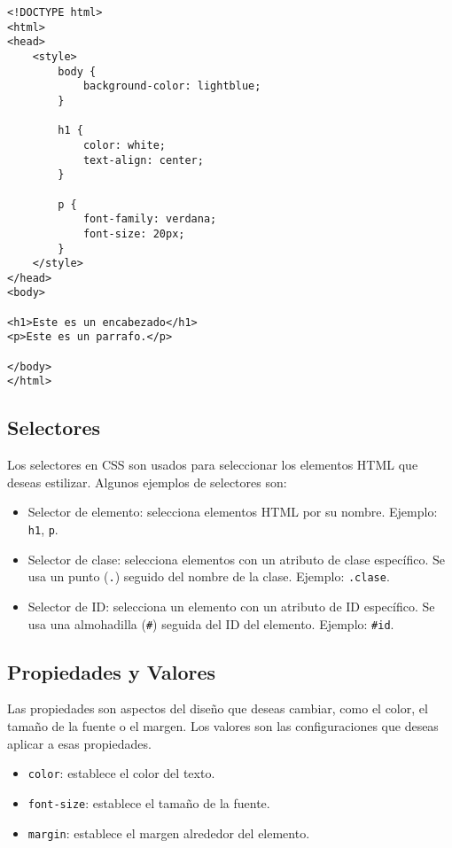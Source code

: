 \documentclass{book}
\begin{document}
\begin{lstlisting}[language=HTML5]
<!DOCTYPE html>
<html>
<head>
    <style>
        body {
            background-color: lightblue;
        }

        h1 {
            color: white;
            text-align: center;
        }

        p {
            font-family: verdana;
            font-size: 20px;
        }
    </style>
</head>
<body>

<h1>Este es un encabezado</h1>
<p>Este es un parrafo.</p>

</body>
</html>
\end{lstlisting}

\subsection{Selectores}

Los selectores en CSS son usados para seleccionar los elementos HTML que deseas estilizar. Algunos ejemplos de selectores son:

\begin{itemize}
    \item Selector de elemento: selecciona elementos HTML por su nombre. Ejemplo: \texttt{h1}, \texttt{p}.
    \item Selector de clase: selecciona elementos con un atributo de clase específico. Se usa un punto (\texttt{.}) seguido del nombre de la clase. Ejemplo: \texttt{.clase}.
    \item Selector de ID: selecciona un elemento con un atributo de ID específico. Se usa una almohadilla (\texttt{\#}) seguida del ID del elemento. Ejemplo: \texttt{\#id}.
\end{itemize}

\subsection{Propiedades y Valores}

Las propiedades son aspectos del diseño que deseas cambiar, como el color, el tamaño de la fuente o el margen. Los valores son las configuraciones que deseas aplicar a esas propiedades.

\begin{itemize}
    \item \texttt{color}: establece el color del texto.
    \item \texttt{font-size}: establece el tamaño de la fuente.
    \item \texttt{margin}: establece el margen alrededor del elemento.
\end{itemize}
\end{document}
